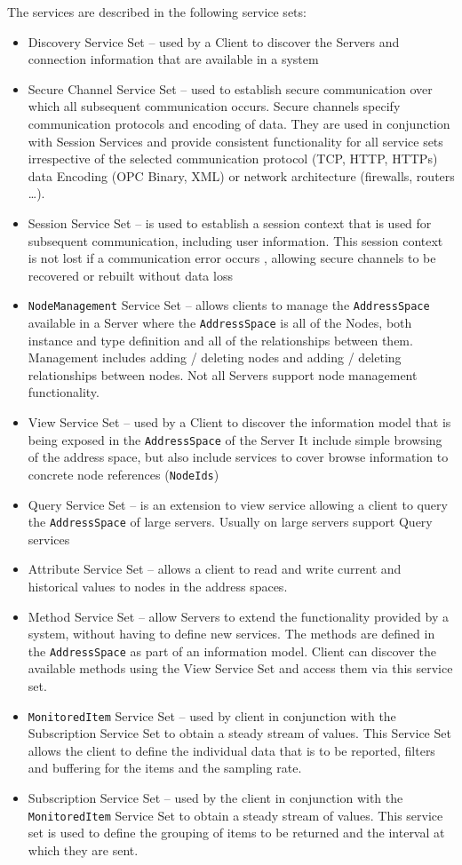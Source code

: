 \documentclass{mtconnect}	%
\begin{document}
The services are described in the following service sets:
\begin{itemize}
\item Discovery Service Set -- used by a Client to discover the Servers and connection information that are available in a system
\item Secure Channel Service Set -- used to establish secure communication over which all subsequent communication occurs. Secure channels specify communication protocols and encoding of data. They are used in conjunction with Session Services and provide consistent functionality for all service sets irrespective of the selected communication protocol (TCP, HTTP, HTTPs) data Encoding (OPC Binary, XML) or network architecture (firewalls, routers \ldots). 
\item Session Service Set -- is used to establish a session context that is used for subsequent communication, including user information. This session context is not lost if a communication error occurs , allowing secure channels to be recovered or rebuilt without data loss
\item \texttt{NodeManagement} Service Set -- allows clients to manage the \texttt{AddressSpace} available in a Server where the \texttt{AddressSpace} is all of the Nodes, both instance and type definition and all of the relationships between them. Management includes adding / deleting nodes and adding / deleting relationships between nodes. Not all Servers support node management functionality.
\item View Service Set – used by a Client to discover the information model that is being exposed in the \texttt{AddressSpace} of the Server It include simple browsing of the address space, but also include services to cover browse information to concrete node references (\texttt{NodeIds})
\item Query Service Set -- is an extension to view service allowing a client to query the \texttt{AddressSpace} of large servers. Usually on large servers support Query services 
\item Attribute Service Set -- allows a client to read and write current and historical values to nodes in the address spaces.
\item Method Service Set -- allow Servers to extend the functionality provided by a system, without having to define new services. The methods are defined in the \texttt{AddressSpace} as part of an information model. Client can discover the available methods using the View Service Set and access them via this service set.
\item \texttt{MonitoredItem} Service Set -- used by client in conjunction with the Subscription Service Set to obtain a steady stream of values. This Service Set allows the client to define the individual data that is to be reported, filters and buffering for the items and the sampling rate.
\item Subscription Service Set -- used by the client in conjunction with the \texttt{Monitored\-Item} Service Set to obtain a steady stream of values. This service set is used to define the grouping of items to be returned and the interval at which they are sent.
\end{itemize}
\end{document}

